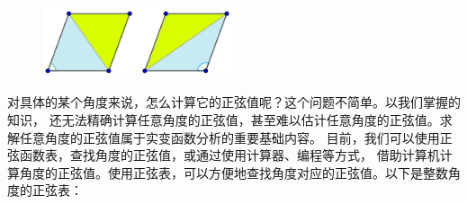\documentclass[12pt,UTF8]{ctexbook}
\begin{document}
\begin{figure}[H] %
    \vspace{4pt}
    \centering
    \includegraphics[width=0.5\textwidth]{正弦菱形1.png}
\end{figure}

对具体的某个角度来说，怎么计算它的正弦值呢？这个问题不简单。以我们掌握的知识，
还无法精确计算任意角度的正弦值，甚至难以估计任意角度的正弦值。求解任意角度的正弦值属于实变函数分析的重要基础内容。
目前，我们可以使用正弦函数表，查找角度的正弦值，或通过使用计算器、编程等方式，
借助计算机计算角度的正弦值。使用正弦表，可以方便地查找角度对应的正弦值。以下是整数角度的正弦表：
\end{document}
